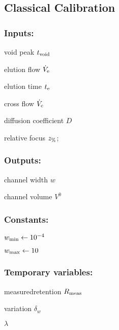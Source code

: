 \subsection*{Classical Calibration}

\subsubsection*{Inputs:}
\begin{multicols}{3}
  \begin{packed_item}
  \item void peak $t_\text{void}$
  \item elution flow $\dot{V}_\text{e}$
  \item elution time $t_\text{e}$
  \item cross flow $\dot{V}_\text{c}$
  \item \small diffusion coefficient \normalsize $D$
  \item relative focus $z_\text{\%}$;
  \end{packed_item}
\end{multicols}

\subsubsection*{Outputs:}
\begin{multicols}{3}
  \begin{packed_item}
  \item channel width $w$
  \item channel volume $V^0$
  \end{packed_item}
\end{multicols}

\subsubsection*{Constants:}
\begin{multicols}{3}
  \begin{packed_item}
    \item $w_\text{min} \leftarrow 10^{-4}$
    \item  $w_\text{max} \leftarrow 10$
  \end{packed_item}
\end{multicols}

\subsubsection*{Temporary variables:}
\begin{multicols}{3}
  \begin{packed_item}
  \item measured\enspace retention $R_\text{meas}$
  \item variation $δ_w$
  \item $\lambda$
  \end{packed_item}
\end{multicols}

